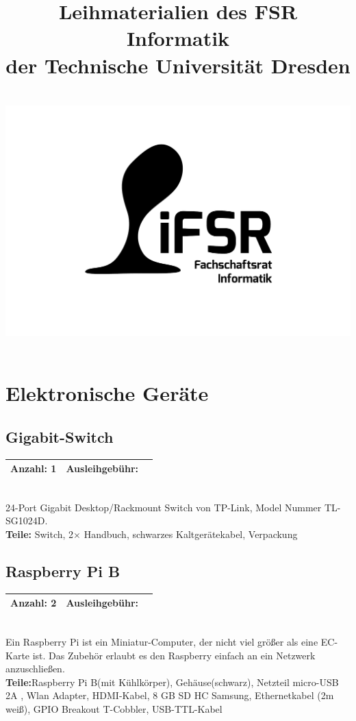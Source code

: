 \documentclass[a4paper]{article}
\newcommand{\iFSR}{FSR Informatik}
\newcommand{\infobox}[3] %
        {\par
                \begin{tabular}{| c | c | c| }
                \hline
                Anzahl: #1 & Ausleihgebühr: \EUR{#2}   \\
                \hline
                \end{tabular} \\
        }
\begin{document}
\title{\bf Leihmaterialien des \iFSR \\
        der Technische Universität Dresden \\~\\
         \includegraphics[width=.3\textwidth]{fsrlogo}
}

\maketitle


\tableofcontents


\pagebreak

\section{Elektronische Geräte}

\subsection{Gigabit-Switch}
\infobox{1}{10}{Neu}
24-Port Gigabit Desktop/Rackmount Switch von TP-Link, Model Nummer TL-SG1024D. \\
\textbf{ Teile:} Switch, 2$\times$ Handbuch, schwarzes Kaltgerätekabel, Verpackung


\subsection{Raspberry Pi B}
\infobox{2}{3}{Neu}
Ein Raspberry Pi ist ein Miniatur-Computer, der nicht viel größer als eine EC-Karte ist. Das Zubehör erlaubt es den Raspberry einfach an ein Netzwerk anzuschließen. \\
\textbf{Teile:}Raspberry Pi B(mit Kühlkörper), Gehäuse(schwarz), Netzteil micro-USB 2A , Wlan Adapter, HDMI-Kabel, 8 GB SD HC Samsung, Ethernetkabel (2m weiß), GPIO Breakout T-Cobbler, USB-TTL-Kabel 
\end{document}
